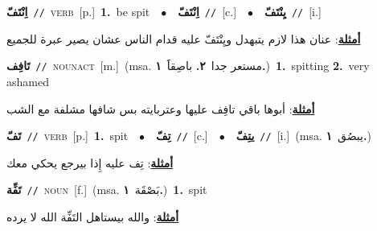 \documentclass[10pt,a4paper,twoside]{article} %
\begin{document}
\begin{multicols}{2}
{\setlength\topsep{0pt}\textbf{\foreignlanguage{arabic}{اِنْتَفّ}}\ {\color{gray}\texttt{//}\color{black}}\ \textsc{verb}\ [p.]\ \textbf{1.}~be spit\ \ $\bullet$\ \ \setlength\topsep{0pt}\textbf{\foreignlanguage{arabic}{اِنْتَفّ}}\ {\color{gray}\texttt{//}\color{black}}\ [c.]\ \ $\bullet$\ \ \setlength\topsep{0pt}\textbf{\foreignlanguage{arabic}{يِنْتَفّ}}\ {\color{gray}\texttt{//}\color{black}}\ [i.]\  \begin{flushright}\color{gray}\foreignlanguage{arabic}{\textbf{\underline{\foreignlanguage{arabic}{أمثلة}}}: عنان هذا لازم يتبهدل ويِنْتَفّ عليه قدام الناس عشان يصير عبرة للجميع}\end{flushright}\color{black}} \vspace{2mm}

{\setlength\topsep{0pt}\textbf{\foreignlanguage{arabic}{تَافِف}}\ {\color{gray}\texttt{//}\color{black}}\ \textsc{noun\textunderscore act}\ [m.]\ \color{gray}(msa. \foreignlanguage{arabic}{مستعر جدا}~\foreignlanguage{arabic}{\textbf{٢.}}  \foreignlanguage{arabic}{باصِقاََ}~\foreignlanguage{arabic}{\textbf{١.}})\color{black}\ \textbf{1.}~spitting  \textbf{2.}~very ashamed\  \begin{flushright}\color{gray}\foreignlanguage{arabic}{\textbf{\underline{\foreignlanguage{arabic}{أمثلة}}}: أبوها باقي تافِف عليها وعتربايته بس شافها مشلفة مع الشب}\end{flushright}\color{black}} \vspace{2mm}

{\setlength\topsep{0pt}\textbf{\foreignlanguage{arabic}{تَفّ}}\ {\color{gray}\texttt{//}\color{black}}\ \textsc{verb}\ [p.]\ \textbf{1.}~spit\ \ $\bullet$\ \ \setlength\topsep{0pt}\textbf{\foreignlanguage{arabic}{تِفّ}}\ {\color{gray}\texttt{//}\color{black}}\ [c.]\ \ $\bullet$\ \ \setlength\topsep{0pt}\textbf{\foreignlanguage{arabic}{يتِفّ}}\ {\color{gray}\texttt{//}\color{black}}\ [i.]\ \color{gray}(msa. \foreignlanguage{arabic}{يبصُق}~\foreignlanguage{arabic}{\textbf{١.}})\color{black}\  \begin{flushright}\color{gray}\foreignlanguage{arabic}{\textbf{\underline{\foreignlanguage{arabic}{أمثلة}}}: تِف عليه إِذا بيرجع يحكي معك}\end{flushright}\color{black}} \vspace{2mm}

{\setlength\topsep{0pt}\textbf{\foreignlanguage{arabic}{تَفِّة}}\ {\color{gray}\texttt{//}\color{black}}\ \textsc{noun}\ [f.]\ \color{gray}(msa. \foreignlanguage{arabic}{بَصْقَة}~\foreignlanguage{arabic}{\textbf{١.}})\color{black}\ \textbf{1.}~spit\  \begin{flushright}\color{gray}\foreignlanguage{arabic}{\textbf{\underline{\foreignlanguage{arabic}{أمثلة}}}: والله بيستاهل التَفِّة الله لا يرده}\end{flushright}\color{black}} \vspace{2mm}


\end{multicols}
\end{document}
